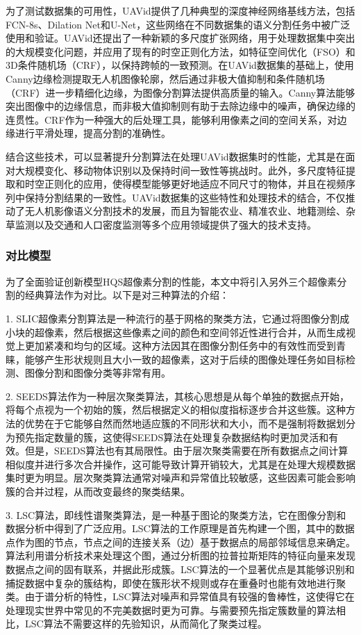 为了测试数据集的可用性，UAVid提供了几种典型的深度神经网络基线方法，包括FCN-8s、Dilation Net和U-Net，这些网络在不同数据集的语义分割任务中被广泛使用和验证。UAVid还提出了一种新颖的多尺度扩张网络，用于处理数据集中突出的大规模变化问题，并应用了现有的时空正则化方法，如特征空间优化（FSO）和3D条件随机场（CRF），以保持跨帧的一致预测。在UAVid数据集的基础上，使用Canny边缘检测提取无人机图像轮廓，然后通过非极大值抑制和条件随机场（CRF）进一步精细化边缘，为图像分割算法提供高质量的输入。Canny算法能够突出图像中的边缘信息，而非极大值抑制则有助于去除边缘中的噪声，确保边缘的连贯性。CRF作为一种强大的后处理工具，能够利用像素之间的空间关系，对边缘进行平滑处理，提高分割的准确性。

结合这些技术，可以显著提升分割算法在处理UAVid数据集时的性能，尤其是在面对大规模变化、移动物体识别以及保持时间一致性等挑战时。此外，多尺度特征提取和时空正则化的应用，使得模型能够更好地适应不同尺寸的物体，并且在视频序列中保持分割结果的一致性。UAVid数据集的这些特性和处理技术的结合，不仅推动了无人机影像语义分割技术的发展，而且为智能农业、精准农业、地籍测绘、杂草监测以及交通和人口密度监测等多个应用领域提供了强大的技术支持。


\subsubsection{对比模型}
为了全面验证创新模型HQS超像素分割的性能，本文中将引入另外三个超像素分割的经典算法作为对比。以下是对三种算法的介绍：

1. SLIC超像素分割算法是一种流行的基于网格的聚类方法，它通过将图像分割成小块的超像素，然后根据这些像素之间的颜色和空间邻近性进行合并，从而生成视觉上更加紧凑和均匀的区域。这种方法因其在图像分割任务中的有效性而受到青睐，能够产生形状规则且大小一致的超像素，这对于后续的图像处理任务如目标检测、图像分割和图像分类等非常有用。

2. SEEDS算法作为一种层次聚类算法，其核心思想是从每个单独的数据点开始，将每个点视为一个初始的簇，然后根据定义的相似度指标逐步合并这些簇。这种方法的优势在于它能够自然而然地适应簇的不同形状和大小，而不是强制将数据划分为预先指定数量的簇，这使得SEEDS算法在处理复杂数据结构时更加灵活和有效。但是，SEEDS算法也有其局限性。由于层次聚类需要在所有数据点之间计算相似度并进行多次合并操作，这可能导致计算开销较大，尤其是在处理大规模数据集时更为明显。层次聚类算法通常对噪声和异常值比较敏感，这些因素可能会影响簇的合并过程，从而改变最终的聚类结果。

3. LSC算法，即线性谱聚类算法，是一种基于图论的聚类方法，它在图像分割和数据分析中得到了广泛应用。LSC算法的工作原理是首先构建一个图，其中的数据点作为图的节点，节点之间的连接关系（边）基于数据点的局部邻域信息来确定。算法利用谱分析技术来处理这个图，通过分析图的拉普拉斯矩阵的特征向量来发现数据点之间的固有联系，并据此形成簇。LSC算法的一个显著优点是其能够识别和捕捉数据中复杂的簇结构，即使在簇形状不规则或存在重叠时也能有效地进行聚类。由于谱分析的特性，LSC算法对噪声和异常值具有较强的鲁棒性，这使得它在处理现实世界中常见的不完美数据时更为可靠。与需要预先指定簇数量的算法相比，LSC算法不需要这样的先验知识，从而简化了聚类过程。

